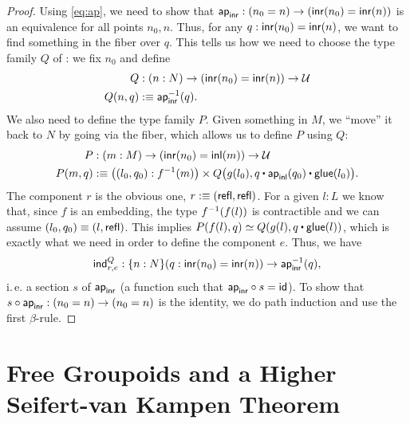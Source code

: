\begin{proof}
 Using \eqref{eq:ap}, we need to show that $\mathsf{ap}_{\mathsf{inr}} : (n_0 = n) \to (\mathsf{inr}(n_0) = \mathsf{inr}(n))$
 is an equivalence for all points $n_0, n$.
 Thus, for any $q : \mathsf{inr}(n_0) = \mathsf{inr}(n)$, we want to find something in the fiber over $q$.
 This tells us how we need to choose the type family $Q$ of :
 we fix $n_0$ and define
 \begin{align*}
  Q &: (n : N) \to (\mathsf{inr}(n_0) = \mathsf{inr}(n)) \to \mathcal{U} \\ 
  Q(n,q) &:\equiv \mathsf{ap}_{\mathsf{inr}}^{-1}(q).
 \end{align*}
 We also need to define the type family $P$.
 Given something in $M$, we ``move'' it back to $N$ by going via the fiber, which
 allows us to define $P$ using $Q$:
 \begin{align*}
  P &: (m : M) \to (\inr(n_0) = \inl(m)) \to \UU \\
  P(m,q) &:\equiv \left((l_0, q_0) : f^{-1}(m)\right) \times
      Q\big(g(l_0), q \ct \ap_{\inl}(q_0) \ct \glue(l_0)\big).
 \end{align*}
 The component $r$ is the obvious one,
 $r :\equiv (\mathsf{refl}, \mathsf{refl})$.
 For a given $l:L$ we know that, since $f$ is an embedding, the type $f^{-1}(f(l))$
 is contractible and we can assume $(l_0, q_0) \equiv (l, \mathsf{refl})$.
 This implies $P(f(l),q) \simeq Q(g(l),q \ct \glue(l))$, which is exactly what we
 need in order to define the component $e$.
 Thus, we have 
 \begin{equation*}
  \mathsf{ind}^Q_{r,e} : \{n : N\}(q : \mathsf{inr}(n_0) = \mathsf{inr}(n)) \to \mathsf{ap}_{\mathsf{inr}}^{-1}(q),
 \end{equation*}
 i.\,e. a section $s$ of $\mathsf{ap}_{\mathsf{inr}}$ (a function such that $\mathsf{ap}_{\mathsf{inr}} \circ s = \mathsf{id}$).
 To show that $s \circ \mathsf{ap}_{\mathsf{inr}} : (n_0 = n) \to (n_0 = n)$ is the identity,
 we do path induction and use the first $\beta$-rule.
\end{proof}

\section{Free Groupoids and a Higher Seifert-van Kampen Theorem}\label{sec:paths-svk}

